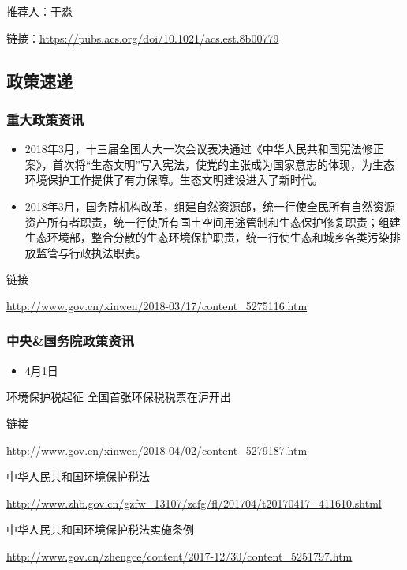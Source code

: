 \documentclass[]{book}
\providecommand{\tightlist}{%
  \setlength{\itemsep}{0pt}\setlength{\parskip}{0pt}}
\begin{document}
推荐人：于淼

链接：\url{https://pubs.acs.org/doi/10.1021/acs.est.8b00779}

\subsection*{政策速递}

\subsubsection*{重大政策资讯}

\begin{itemize}
\item
  2018年3月，十三届全国人大一次会议表决通过《中华人民共和国宪法修正案》，首次将``生态文明''写入宪法，使党的主张成为国家意志的体现，为生态环境保护工作提供了有力保障。生态文明建设进入了新时代。
\item
  2018年3月，国务院机构改革，组建自然资源部，统一行使全民所有自然资源资产所有者职责，统一行使所有国土空间用途管制和生态保护修复职责；组建生态环境部，整合分散的生态环境保护职责，统一行使生态和城乡各类污染排放监管与行政执法职责。
\end{itemize}

链接

\url{http://www.gov.cn/xinwen/2018-03/17/content_5275116.htm}

\subsubsection*{中央\&国务院政策资讯}

\begin{itemize}
\tightlist
\item
  4月1日
\end{itemize}

环境保护税起征 全国首张环保税税票在沪开出

链接

\url{http://www.gov.cn/xinwen/2018-04/02/content_5279187.htm}

中华人民共和国环境保护税法

\url{http://www.zhb.gov.cn/gzfw_13107/zcfg/fl/201704/t20170417_411610.shtml}

中华人民共和国环境保护税法实施条例

\url{http://www.gov.cn/zhengce/content/2017-12/30/content_5251797.htm}
\end{document}
